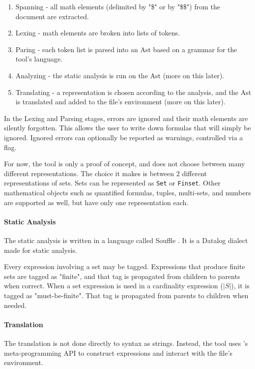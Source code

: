 \documentclass{article}
\newcommand{\abs}[1]{\left| #1 \right|}
\newcommand{\code}{\texttt}
\begin{document}
\begin{enumerate}
    \item Spanning - all math elements (delimited by "\$" or by "\$\$") from the
        document are extracted.
    \item Lexing - math elements are broken into lists of tokens.
    \item Paring - each token list is parsed into an Ast based on a grammar for
        the tool's language.
    \item Analyzing - the static analysis is run on the Ast (more on this later).
    \item Translating - a representation is chosen according to the analysis,
        and the Ast is translated and added to the file's environment (more on
        this later).
\end{enumerate}

In the Lexing and Parsing stages, errors are ignored and their math elements are
silently forgotten. This allows the user to write down formulas that will simply
be ignored. Ignored errors can optionally be reported as warnings, controlled
via a flag.

For now, the tool is only a proof of concept, and does not choose between many
different representations. The choice it makes is between 2 different
representations of sets. Sets can be represented as \code{Set} or \code{Finset}.
Other mathematical objects such as quantified formulas, tuples, multi-sets, and
numbers are supported as well, but have only one representation each.

\paragraph{Static Analysis}
The static analysis is written in a language called Souffle \cite{Jordan2016SoufflOS}.
It is a Datalog dialect made for static analysis.

Every expression involving a set may be tagged.
Expressions that produce finite sets are tagged as "finite", and that tag is
propagated from children to parents when correct.
When a set expression is used in a cardinality expression ($\abs{S}$), it is
tagged as "must-be-finite". That tag is propagated from parents to children when
needed.

\paragraph{Translation}
The translation is not done directly to \lean syntax as strings.
Instead, the tool uses \lean's meta-programming API to construct \lean
expressions and interact with the file's environment.
\end{document}

